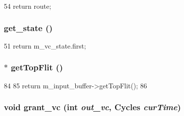 \begin{DoxyCode}
54 { return route; }
\end{DoxyCode}
\hypertarget{classVirtualChannel__d_a98903fcefba4495876a823919d088853}{
\subsubsection[{get\_\-state}]{ get\_\-state ()}}
\label{classVirtualChannel__d_a98903fcefba4495876a823919d088853}



\begin{DoxyCode}
51 { return m_vc_state.first; }
\end{DoxyCode}
\hypertarget{classVirtualChannel__d_a5b9261af9ccdd053e2311fb749c88fa6}{
\subsubsection[{getTopFlit}]{$\ast$ getTopFlit ()}}
\label{classVirtualChannel__d_a5b9261af9ccdd053e2311fb749c88fa6}



\begin{DoxyCode}
84     {
85         return m_input_buffer->getTopFlit();
86     }
\end{DoxyCode}
\hypertarget{classVirtualChannel__d_a4f1041428fbfcf7c0db1b9032437c533}{
\subsubsection[{grant\_\-vc}]{\setlength{\rightskip}{0pt plus 5cm}void grant\_\-vc (int {\em out\_\-vc}, \/  {\bf Cycles} {\em curTime})}}
\label{classVirtualChannel__d_a4f1041428fbfcf7c0db1b9032437c533}



